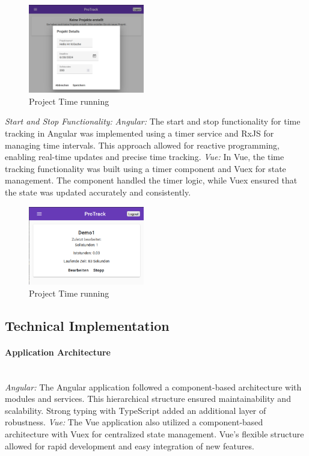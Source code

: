 \documentclass[conference]{IEEEtran}
\begin{document}
\begin{figure}[h!]
    \centering
    \includegraphics[width=0.45\textwidth]{newProject.png}
    \caption{Project Time running}
    \label{fig:ProTrack}
\end{figure}
\newpage
\textit{Start and Stop Functionality:\newline}
\textit{Angular: }The start and stop functionality for time tracking in Angular was implemented using a timer service and RxJS for managing time intervals. This approach allowed for reactive programming, enabling real-time updates and precise time tracking.
\newline\textit{Vue: }In Vue, the time tracking functionality was built using a timer component and Vuex for state management. The component handled the timer logic, while Vuex ensured that the state was updated accurately and consistently.

\begin{figure}[h!]
    \centering
    \includegraphics[width=0.45\textwidth]{StartTimeRecording.png}
    \caption{Project Time running}
    \label{fig:ProTrack}
\end{figure}

\subsection{Technical Implementation}
\paragraph{Application Architecture}
\textit{\\Angular: }The Angular application followed a component-based architecture with modules and services. This hierarchical structure ensured maintainability and scalability. Strong typing with TypeScript added an additional layer of robustness.
\newline\textit{Vue: }The Vue application also utilized a component-based architecture with Vuex for centralized state management. Vue's flexible structure allowed for rapid development and easy integration of new features.
\end{document}
